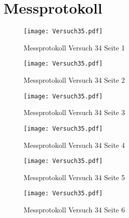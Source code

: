 \section{Messprotokoll}
\begin{figure}[h!]
    \centering
    \texttt{[image: Versuch35.pdf]}
    \caption{Messprotokoll Versuch 34 Seite 1}
\end{figure}
\newpage
\begin{figure}[h!]
    \centering
    \texttt{[image: Versuch35.pdf]}
    \caption{Messprotokoll Versuch 34 Seite 2}
\end{figure}
\newpage
\begin{figure}[h!]
    \centering
    \texttt{[image: Versuch35.pdf]}
    \caption{Messprotokoll Versuch 34  Seite 3}
\end{figure}
\newpage
\begin{figure}[h!]
    \centering
    \texttt{[image: Versuch35.pdf]}
    \caption{Messprotokoll Versuch 34 Seite 4}
\end{figure}
\newpage
\begin{figure}[h!]
    \centering
    \texttt{[image: Versuch35.pdf]}
    \caption{Messprotokoll Versuch 34  Seite 5}
\end{figure}
\newpage
\begin{figure}[h!]
    \centering
    \texttt{[image: Versuch35.pdf]}
    \caption{Messprotokoll Versuch 34  Seite 6}
\end{figure}
\newpage